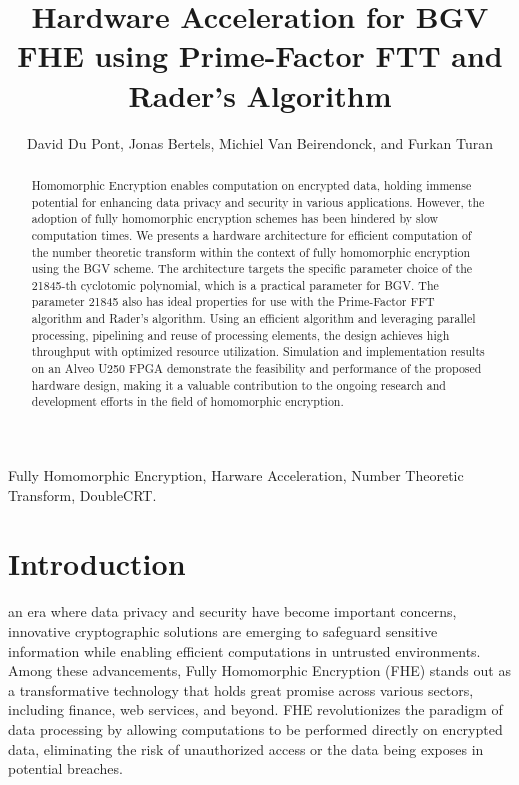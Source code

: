 \documentclass[lettersize,journal]{IEEEtran}
\begin{document}
\title{Hardware Acceleration for BGV FHE using Prime-Factor FTT and Rader's Algorithm}

\author{David Du Pont, Jonas Bertels, Michiel Van Beirendonck, and Furkan Turan}



\maketitle

\begin{abstract}
Homomorphic Encryption enables computation on encrypted data, holding immense potential for enhancing data privacy and security in various applications. However, the adoption of fully homomorphic encryption schemes has been hindered by slow computation times. We presents a hardware architecture for efficient computation of the number theoretic transform within the context of fully homomorphic encryption using the BGV scheme. The architecture targets the specific parameter choice of the 21845-th cyclotomic polynomial, which is a practical parameter for BGV. The parameter 21845 also has ideal properties for use with the Prime-Factor FFT algorithm and Rader's algorithm. Using an efficient algorithm and leveraging parallel processing, pipelining and reuse of processing elements, the design achieves high throughput with optimized resource utilization. Simulation and implementation results on an Alveo U250 FPGA demonstrate the feasibility and performance of the proposed hardware design, making it a valuable contribution to the ongoing research and development efforts in the field of homomorphic encryption.
\end{abstract}

\begin{IEEEkeywords}
Fully Homomorphic Encryption, Harware Acceleration, Number Theoretic Transform, DoubleCRT.
\end{IEEEkeywords}

\section{Introduction}
 an era where data privacy and security have become important concerns, innovative cryptographic solutions are emerging to safeguard sensitive information while enabling efficient computations in untrusted environments. Among these advancements, Fully Homomorphic Encryption (FHE) stands out as a transformative technology that holds great promise across various sectors, including finance, web services, and beyond. FHE revolutionizes the paradigm of data processing by allowing computations to be performed directly on encrypted data, eliminating the risk of unauthorized access or the data being exposes in potential breaches.
\end{document}
